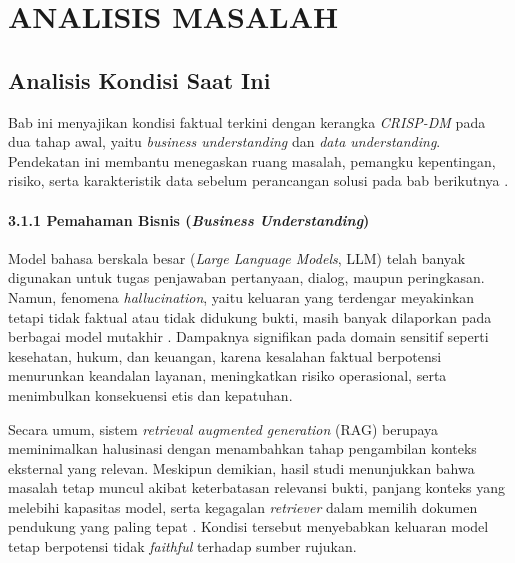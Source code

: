 
\chapter{ANALISIS MASALAH}
\label{chap:analisis-masalah}

\section{Analisis Kondisi Saat Ini}
\label{sec:analisis-kondisi-saat-ini}

Bab ini menyajikan kondisi faktual terkini dengan kerangka \textit{CRISP-DM} pada dua tahap awal, yaitu \textit{business understanding} dan \textit{data understanding}. Pendekatan ini membantu menegaskan ruang masalah, pemangku kepentingan, risiko, serta karakteristik data sebelum perancangan solusi pada bab berikutnya \parencite{wirth2000crispdm,studer2021crispmlq}.

\subsubsection*{3.1.1 Pemahaman Bisnis (\textit{Business Understanding})}

Model bahasa berskala besar (\textit{Large Language Models}, LLM) telah banyak digunakan untuk tugas penjawaban pertanyaan, dialog, maupun peringkasan. Namun, fenomena \textit{hallucination}, yaitu keluaran yang terdengar meyakinkan tetapi tidak faktual atau tidak didukung bukti, masih banyak dilaporkan pada berbagai model mutakhir \parencite{zhao2023survey,math2024hallucination}. Dampaknya signifikan pada domain sensitif seperti kesehatan, hukum, dan keuangan, karena kesalahan faktual berpotensi menurunkan keandalan layanan, meningkatkan risiko operasional, serta menimbulkan konsekuensi etis dan kepatuhan.

Secara umum, sistem \textit{retrieval augmented generation} (RAG) berupaya meminimalkan halusinasi dengan menambahkan tahap pengambilan konteks eksternal yang relevan. Meskipun demikian, hasil studi menunjukkan bahwa masalah tetap muncul akibat keterbatasan relevansi bukti, panjang konteks yang melebihi kapasitas model, serta kegagalan \textit{retriever} dalam memilih dokumen pendukung yang paling tepat \parencite{shuster2021retrieval}. Kondisi tersebut menyebabkan keluaran model tetap berpotensi tidak \textit{faithful} terhadap sumber rujukan.

